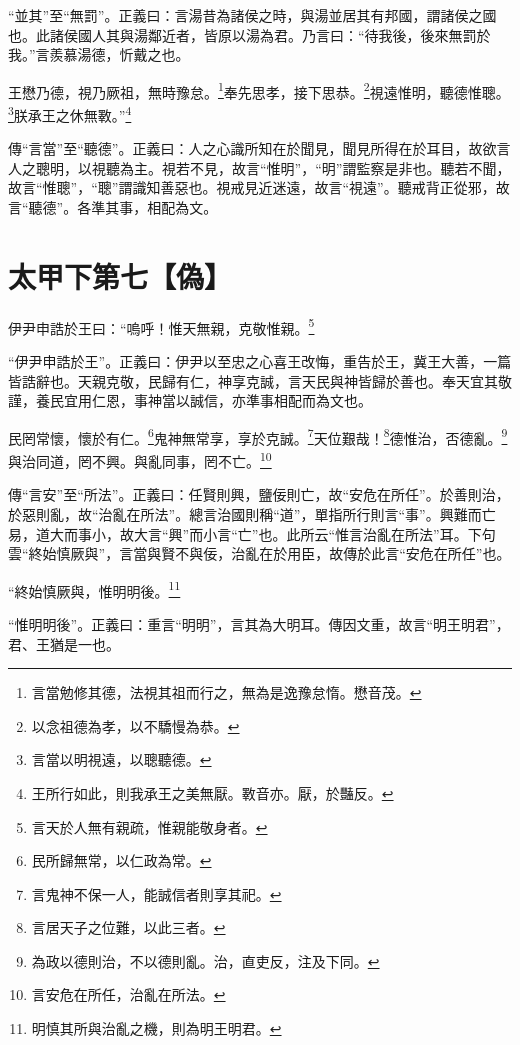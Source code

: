 {\noindent\shu{}\fzkt “並其”至“無罰”。正義曰：言湯昔為諸侯之時，與湯並居其有邦國，謂諸侯之國也。此諸侯國人其與湯鄰近者，皆原以湯為君。乃言曰：“待我後，後來無罰於我。”言羨慕湯德，忻戴之也。 \par}

王懋乃德，視乃厥祖，無時豫怠。\footnote{言當勉修其德，法視其祖而行之，無為是逸豫怠惰。懋音茂。}奉先思孝，接下思恭。\footnote{以念祖德為孝，以不驕慢為恭。}視遠惟明，聽德惟聰。\footnote{言當以明視遠，以聰聽德。}朕承王之休無斁。”\footnote{王所行如此，則我承王之美無厭。斁音亦。厭，於豔反。}

{\noindent\zhuan{}\fzbyks 傳“言當”至“聽德”。正義曰：人之心識所知在於聞見，聞見所得在於耳目，故欲言人之聰明，以視聽為主。視若不見，故言“惟明”，“明”謂監察是非也。聽若不聞，故言“惟聰”，“聰”謂識知善惡也。視戒見近迷遠，故言“視遠”。聽戒背正從邪，故言“聽德”。各準其事，相配為文。 \par}

\section{太甲下第七【偽】}


伊尹申誥於王曰：“嗚呼！惟天無親，克敬惟親。\footnote{言天於人無有親疏，惟親能敬身者。}

{\noindent\shu{}\fzkt “伊尹申誥於王”。正義曰：伊尹以至忠之心喜王改悔，重告於王，冀王大善，一篇皆誥辭也。天親克敬，民歸有仁，神享克誠，言天民與神皆歸於善也。奉天宜其敬謹，養民宜用仁恩，事神當以誠信，亦準事相配而為文也。 \par}

民罔常懷，懷於有仁。\footnote{民所歸無常，以仁政為常。}鬼神無常享，享於克誠。\footnote{言鬼神不保一人，能誠信者則享其祀。}天位艱哉！\footnote{言居天子之位難，以此三者。}德惟治，否德亂。\footnote{為政以德則治，不以德則亂。治，直吏反，注及下同。}與治同道，罔不興。與亂同事，罔不亡。\footnote{言安危在所任，治亂在所法。}

{\noindent\zhuan{}\fzbyks 傳“言安”至“所法”。正義曰：任賢則興，鹽佞則亡，故“安危在所任”。於善則治，於惡則亂，故“治亂在所法”。總言治國則稱“道”，單指所行則言“事”。興難而亡易，道大而事小，故大言“興”而小言“亡”也。此所云“惟言治亂在所法”耳。下句雲“終始慎厥與”，言當與賢不與佞，治亂在於用臣，故傳於此言“安危在所任”也。 \par}

“終始慎厥與，惟明明後。\footnote{明慎其所與治亂之機，則為明王明君。}

{\noindent\shu{}\fzkt “惟明明後”。正義曰：重言“明明”，言其為大明耳。傳因文重，故言“明王明君”，君、王猶是一也。 \par}

